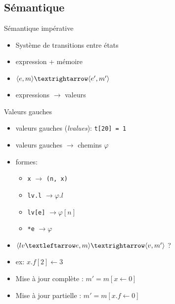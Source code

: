 \subsection{Sémantique}

\begin{frame}{Sémantique impérative}

\begin{itemize}
\item
  Système de transitions entre états
\item
  expression + mémoire
\item
  $\mm{m}{e}{m'}{e'}$
\item expressions $→$ valeurs
\end{itemize}

\end{frame}

\begin{frame}{Valeurs gauches}
    \begin{itemize}
        \item valeurs gauches (\emph{lvalues}): \texttt{t[20] = 1}
        \item valeurs gauches $→$ chemins $φ$
        \item formes:
            \begin{itemize}
                \item \texttt{x} $→$ \texttt{(n, x)}
                \item \texttt{lv.l} $→ φ.l$
                \item \texttt{lv[e]} $→ φ[n]$
                \item \texttt{*e} $→ φ$
            \end{itemize}
        \item $\mm{m}{lv ← e}{m'}{v}$ ?
        \item ex: $x.f[2] ← 3$
        \item Mise à jour complète : $m' = m[ x ← 0]$
        \item Mise à jour partielle : $m' = m[x.f ← 0]$
    \end{itemize}
\end{frame}


